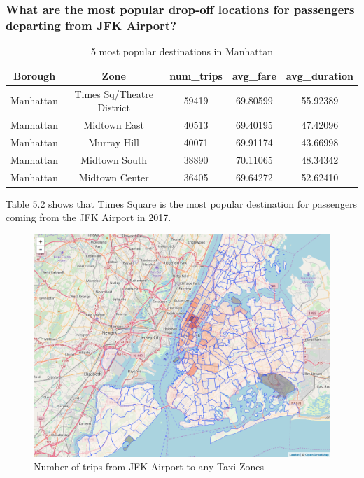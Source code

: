 \documentclass[12pt,twoside]{reedthesis}
\theoremstyle{definition}
\theoremstyle{definition}
\theoremstyle{definition}
\theoremstyle{remark}
\begin{document}
\subsubsection{What are the most popular drop-off locations for
passengers departing from JFK
Airport?}\label{what-are-the-most-popular-drop-off-locations-for-passengers-departing-from-jfk-airport}
\begin{table}

\caption{\label{tab:unnamed-chunk-102}5 most popular destinations in Manhattan}
\centering
\begin{tabular}[t]{ccccc}
\toprule
Borough & Zone & num\_trips & avg\_fare & avg\_duration\\
\midrule
Manhattan & Times Sq/Theatre District & 59419 & 69.80599 & 55.92389\\
Manhattan & Midtown East & 40513 & 69.40195 & 47.42096\\
Manhattan & Murray Hill & 40071 & 69.91174 & 43.66998\\
Manhattan & Midtown South & 38890 & 70.11065 & 48.34342\\
Manhattan & Midtown Center & 36405 & 69.64272 & 52.62410\\
\bottomrule
\end{tabular}
\end{table}
Table 5.2 shows that Times Square is the most popular destination for
passengers coming from the JFK Airport in 2017.
\begin{figure}[h]

{\centering \includegraphics[width=5.84in]{figure/from_jfk_num_trips} 

}

\caption{Number of trips from JFK Airport to any Taxi Zones}\label{fig:from-jfk-num-trips}
\end{figure}
\end{document}
